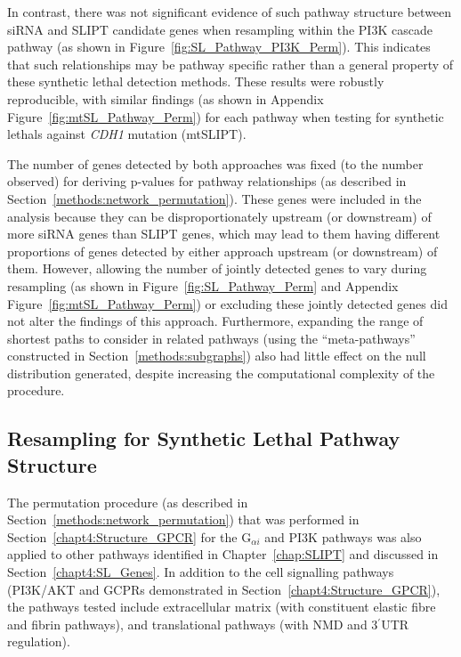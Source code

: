 In contrast, there was not significant evidence of such \gls{pathway} structure between \gls{siRNA} and \gls{SLIPT} candidate genes when resampling within the PI3K cascade \gls{pathway} (as shown in Figure~\ref{fig:SL_Pathway_PI3K_Perm}). This indicates that such relationships may be \gls{pathway} specific rather than a general property of these \gls{synthetic lethal} detection methods. These results were robustly reproducible, with similar findings (as shown in Appendix Figure~\ref{fig:mtSL_Pathway_Perm}) for each \gls{pathway} when testing for \glspl{synthetic lethal} against \textit{CDH1} \gls{mutation} (\acrshort{mtSLIPT}).

The number of genes detected by both approaches was fixed (to the number observed) for deriving p-values for pathway relationships (as described in Section~\ref{methods:network_permutation}). 
These genes were included in the analysis because they can be disproportionately upstream (or downstream) of more \gls{siRNA} genes than \gls{SLIPT} genes, which may lead to them having different proportions of genes detected by either approach upstream (or downstream) of them. 
However, allowing the number of  jointly detected genes to vary during resampling (as shown in Figure~\ref{fig:SL_Pathway_Perm} and Appendix Figure~\ref{fig:mtSL_Pathway_Perm}) or excluding these jointly detected genes did not alter the findings of this approach. Furthermore, expanding the range of \glspl{shortest path} to consider  in related \glspl{pathway} (using the ``meta-\glspl{pathway}'' constructed in Section~\ref{methods:subgraphs}) also had little effect on the null distribution generated, despite increasing the computational complexity of the procedure.

\FloatBarrier

\subsection{Resampling for Synthetic Lethal Pathway Structure}  \label{chapt4:Structure_Perm}

The permutation procedure (as described in Section~\ref{methods:network_permutation}) that was performed in Section~\ref{chapt4:Structure_GPCR} for the G$_{\alpha i}$ and PI3K \glspl{pathway} was also applied to other \glspl{pathway} identified in Chapter~\ref{chap:SLIPT} and discussed in Section~\ref{chapt4:SL_Genes}. In addition to the cell signalling \glspl{pathway} (PI3K/AKT and GCPRs demonstrated in Section~\ref{chapt4:Structure_GPCR}), the \glspl{pathway} tested include extracellular matrix (with constituent elastic fibre and fibrin \glspl{pathway}), and translational \glspl{pathway} (with \gls{NMD} and 3$^\prime$\gls{UTR} regulation).

